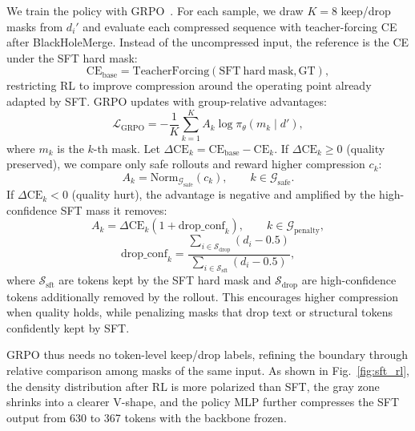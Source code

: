 We train the policy with GRPO~\cite{shao2024deepseekmath}. For each sample, we draw $K=8$ keep/drop masks from $d_i'$ and evaluate each compressed sequence with teacher-forcing CE after BlackHoleMerge. Instead of the uncompressed input, the reference is the CE under the SFT hard mask:
\begin{equation}
\mathrm{CE}_{\mathrm{base}}
=\mathrm{TeacherForcing}(\mathrm{SFT\ hard\ mask},\mathrm{GT}),
\end{equation}
restricting RL to improve compression around the operating point already adapted by SFT. GRPO updates with group-relative advantages:
\begin{equation}
\mathcal{L}_{\mathrm{GRPO}}
=-\frac{1}{K}\sum_{k=1}^{K}
A_k\log \pi_\theta(m_k\mid d'),
\end{equation}
where $m_k$ is the $k$-th mask. Let $\Delta\mathrm{CE}_k=\mathrm{CE}_{\mathrm{base}}-\mathrm{CE}_k$. If $\Delta\mathrm{CE}_k\ge0$ (quality preserved), we compare only safe rollouts and reward higher compression $c_k$:
\begin{equation}
A_k=\mathrm{Norm}_{\mathcal{G}_{\mathrm{safe}}}(c_k),
\qquad k\in\mathcal{G}_{\mathrm{safe}}.
\end{equation}
If $\Delta\mathrm{CE}_k<0$ (quality hurt), the advantage is negative and amplified by the high-confidence SFT mass it removes:
\begin{equation}
A_k=\Delta\mathrm{CE}_k\left(1+\mathrm{drop\_conf}_k\right),
\qquad k\in\mathcal{G}_{\mathrm{penalty}},
\end{equation}
\begin{equation}
\mathrm{drop\_conf}_k=
\frac{\sum_{i\in\mathcal{S}_{\mathrm{drop}}}(d_i-0.5)}
{\sum_{i\in\mathcal{S}_{\mathrm{sft}}}(d_i-0.5)},
\end{equation}
where $\mathcal{S}_{\mathrm{sft}}$ are tokens kept by the SFT hard mask and $\mathcal{S}_{\mathrm{drop}}$ are high-confidence tokens additionally removed by the rollout. This encourages higher compression when quality holds, while penalizing masks that drop text or structural tokens confidently kept by SFT.

GRPO thus needs no token-level keep/drop labels, refining the boundary through relative comparison among masks of the same input. As shown in Fig.~\ref{fig:sft_rl}, the density distribution after RL is more polarized than SFT, the gray zone shrinks into a clearer V-shape, and the policy MLP further compresses the SFT output from 630 to 367 tokens with the backbone frozen.

